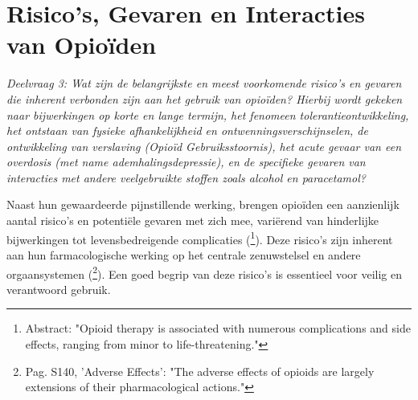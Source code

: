 \documentclass[11pt, a4paper]{report} %
\begin{document}
\chapter{Risico's, Gevaren en Interacties van Opioïden}
\label{ch:risicos}
\textit{Deelvraag 3: Wat zijn de belangrijkste en meest voorkomende risico's en gevaren die inherent verbonden zijn aan het gebruik van opioïden? Hierbij wordt gekeken naar bijwerkingen op korte en lange termijn, het fenomeen tolerantieontwikkeling, het ontstaan van fysieke afhankelijkheid en ontwenningsverschijnselen, de ontwikkeling van verslaving (Opioïd Gebruiksstoornis), het acute gevaar van een overdosis (met name ademhalingsdepressie), en de specifieke gevaren van interacties met andere veelgebruikte stoffen zoals alcohol en paracetamol?}

Naast hun gewaardeerde pijnstillende werking, brengen opioïden een aanzienlijk aantal risico's en potentiële gevaren met zich mee, variërend van hinderlijke bijwerkingen tot levensbedreigende complicaties (\cite{Benyamin2008OpioidComplications}\footnote{Abstract: "Opioid therapy is associated with numerous complications and side effects, ranging from minor to life-threatening."}). Deze risico's zijn inherent aan hun farmacologische werking op het centrale zenuwstelsel en andere orgaansystemen (\cite{Trescot2008OpioidPharm}\footnote{Pag. S140, 'Adverse Effects': "The adverse effects of opioids are largely extensions of their pharmacological actions."}). Een goed begrip van deze risico's is essentieel voor veilig en verantwoord gebruik.
\end{document}
